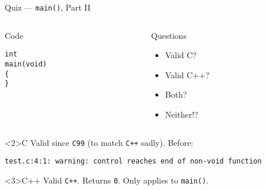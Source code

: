 \documentclass[presentation,aspectratio=169]{beamer}
\begin{document}
\begin{frame}[fragile,label={sec:org23c4234}]{Quiz — \texttt{main()}, Part II}
\begin{columns}
\begin{column}{0.48\columnwidth}
\begin{block}{Code}
\begin{verbatim}
int
main(void)
{
}
\end{verbatim}
\end{block}
\end{column}

\begin{column}{0.48\columnwidth}
\begin{block}{Questions}
\begin{itemize}
\item Valid C?
\item Valid C++?
\item Both?
\item Neither!?
\end{itemize}
\end{block}
\end{column}
\end{columns}

\begin{block}<2>{C}
Valid since \texttt{C99} (to match \texttt{C++} sadly). Before:
\begin{verbatim}
test.c:4:1: warning: control reaches end of non-void function
\end{verbatim}
\end{block}

\vspace{-2cm}
\begin{block}<3>{C++}
Valid \texttt{C++}. Returns \texttt{0}. Only applies to \texttt{main()}.
\end{block}
\end{frame}

\end{document}
